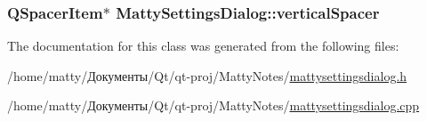 \subsubsection[{\texorpdfstring{vertical\+Spacer}{verticalSpacer}}]{\setlength{\rightskip}{0pt plus 5cm}Q\+Spacer\+Item$\ast$ Matty\+Settings\+Dialog\+::vertical\+Spacer\hspace{0.3cm}{\ttfamily [private]}}\hypertarget{class_matty_settings_dialog_a7fd31624e0d2669cedf9ca4f107ee559}{}\label{class_matty_settings_dialog_a7fd31624e0d2669cedf9ca4f107ee559}


The documentation for this class was generated from the following files\+:\begin{DoxyCompactItemize}
\item 
/home/matty/Документы/\+Qt/qt-\/proj/\+Matty\+Notes/\hyperlink{mattysettingsdialog_8h}{mattysettingsdialog.\+h}\item 
/home/matty/Документы/\+Qt/qt-\/proj/\+Matty\+Notes/\hyperlink{mattysettingsdialog_8cpp}{mattysettingsdialog.\+cpp}\end{DoxyCompactItemize}
